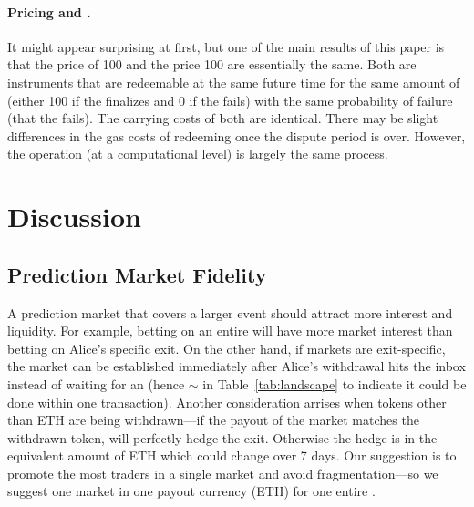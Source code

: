 \paragraph*{Pricing \final and \fail.}

It might appear surprising at first, but one of the main results of this paper is that the price of 100 \ethxx and the price 100 \fail are essentially the same. Both are instruments that are redeemable at the same future time for the same amount of \ethone (either 100 if the \rblock finalizes and 0 if the \rblock fails) with the same probability of failure (that the \rblock fails). The carrying costs of both are identical. There may be slight differences in the gas costs of redeeming \ethone once the dispute period is over. However, the operation (at a computational level) is largely the same process. 

\section{Discussion}

\subsection{Prediction Market Fidelity}
\label{sec:fidelity}


A prediction market that covers a larger event should attract more interest and liquidity. For example, betting on an entire \rblock will have more market interest than betting on Alice's specific exit. On the other hand, if markets are exit-specific, the market can be established immediately after Alice's withdrawal hits the inbox instead of waiting for an \rblock (hence $\sim$ in Table~\ref{tab:landscape} to indicate it could be done within one \layerone transaction). Another consideration arrises when tokens other than ETH are being withdrawn---if the payout of the market matches the withdrawn token, \fail will perfectly hedge the exit. Otherwise the hedge is in the equivalent amount of ETH which could change over 7 days. Our suggestion is to promote the most traders in a single market and avoid fragmentation---so we suggest one market in one payout currency (ETH) for one entire \rblock.

